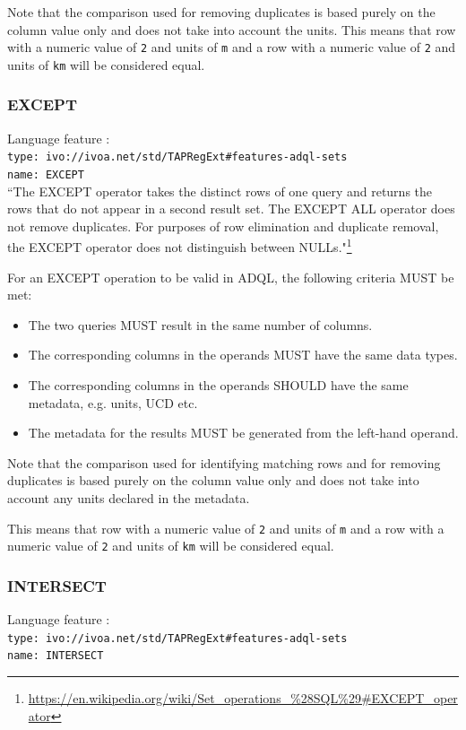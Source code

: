 \documentclass[11pt,a4paper]{ivoa}
\begin{document}
Note that the comparison used for removing duplicates is based purely on the
column value only and does not take into account the units.
This means that row with a numeric value of \verb:2: and units of \verb:m:
and a row with a numeric value of \verb:2: and units of \verb:km: will be
considered equal.

\subsubsection{EXCEPT}
{\footnotesize Language feature :}\\
{\footnotesize \verb|type: ivo://ivoa.net/std/TAPRegExt#features-adql-sets|}\\
{\footnotesize \verb|name: EXCEPT|}\\

``The EXCEPT operator takes the distinct rows of one query and returns the
rows that do not appear in a second result set. The EXCEPT ALL operator
does not remove duplicates. For purposes of row elimination and duplicate
removal, the EXCEPT operator does not distinguish between NULLs."\footnote{\url{https://en.wikipedia.org/wiki/Set\_operations\_\%28SQL\%29\#EXCEPT\_operator}}

For an EXCEPT operation to be valid in ADQL, the following criteria MUST be met:

\begin{itemize}
    \item The two queries MUST result in the same number of columns.
    \item The corresponding columns in the operands MUST have the same data types.
    \item The corresponding columns in the operands SHOULD have the same metadata, e.g. units, UCD etc.
    \item The metadata for the results MUST be generated from the left-hand operand.
\end{itemize}

Note that the comparison used for identifying matching rows and for removing
duplicates is based purely on the column value only and does not take into
account any units declared in the metadata.

This means that row with a numeric value of \verb:2: and units of \verb:m:
and a row with a numeric value of \verb:2: and units of \verb:km: will be
considered equal.

\subsubsection{INTERSECT}
{\footnotesize Language feature :}\\
{\footnotesize \verb|type: ivo://ivoa.net/std/TAPRegExt#features-adql-sets|}\\
{\footnotesize \verb|name: INTERSECT|}\\
\end{document}
